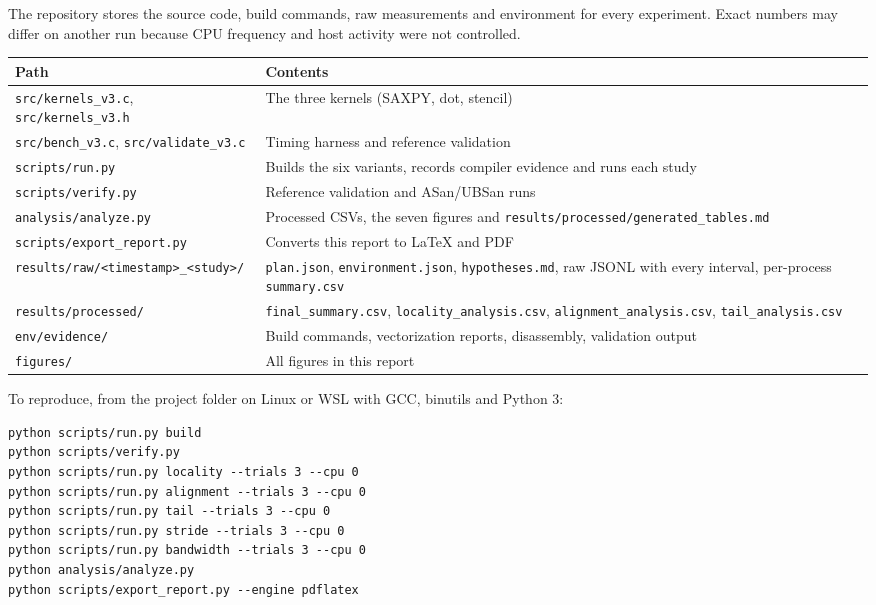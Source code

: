 \documentclass[10pt,letterpaper]{article}
\begin{document}
The repository stores the source code, build commands, raw measurements and environment for every experiment. Exact numbers may differ on another run because CPU frequency and host activity were not controlled.


{\footnotesize\begin{longtable}{>{\raggedright\arraybackslash}p{0.3962\dimexpr\linewidth-4\tabcolsep\relax}>{\raggedright\arraybackslash}p{0.6038\dimexpr\linewidth-4\tabcolsep\relax}}\toprule
\textbf{Path} & \textbf{Contents} \\ \midrule\endhead
\texttt{src/kernels\_v3.c}, \texttt{src/kernels\_v3.h} & The three kernels (SAXPY, dot, stencil) \\
\texttt{src/bench\_v3.c}, \texttt{src/validate\_v3.c} & Timing harness and reference validation \\
\texttt{scripts/run.py} & Builds the six variants, records compiler evidence and runs each study \\
\texttt{scripts/verify.py} & Reference validation and ASan/UBSan runs \\
\texttt{analysis/analyze.py} & Processed CSVs, the seven figures and \texttt{results/processed/generated\_tables.md} \\
\texttt{scripts/export\_report.py} & Converts this report to LaTeX and PDF \\
\texttt{results/raw/<timestamp>\_<study>/} & \texttt{plan.json}, \texttt{environment.json}, \texttt{hypotheses.md}, raw JSONL with every interval, per-process \texttt{summary.csv} \\
\texttt{results/processed/} & \texttt{final\_summary.csv}, \texttt{locality\_analysis.csv}, \texttt{alignment\_analysis.csv}, \texttt{tail\_analysis.csv} \\
\texttt{env/evidence/} & Build commands, vectorization reports, disassembly, validation output \\
\texttt{figures/} & All figures in this report \\
\bottomrule\end{longtable}}

To reproduce, from the project folder on Linux or WSL with GCC, binutils and Python 3:


{\footnotesize\begin{verbatim}
python scripts/run.py build
python scripts/verify.py
python scripts/run.py locality --trials 3 --cpu 0
python scripts/run.py alignment --trials 3 --cpu 0
python scripts/run.py tail --trials 3 --cpu 0
python scripts/run.py stride --trials 3 --cpu 0
python scripts/run.py bandwidth --trials 3 --cpu 0
python analysis/analyze.py
python scripts/export_report.py --engine pdflatex
\end{verbatim}}
\end{document}

